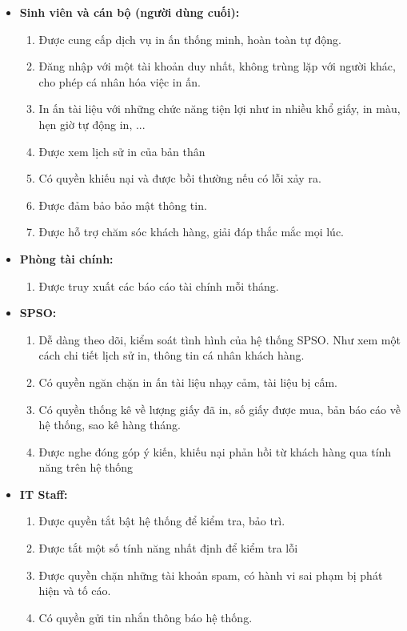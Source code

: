 \begin{itemize}
    \item \textbf{Sinh viên và cán bộ (người dùng cuối):}
    \begin{enumerate}[- ]
        \item Được cung cấp dịch vụ in ấn thống minh, hoàn toàn tự động. 
        \item Đăng nhập với một tài khoản duy nhất, không trùng lặp với người khác, cho phép cá nhân hóa việc in ấn.
        \item In ấn tài liệu với những chức năng tiện lợi như in nhiều khổ giấy, in màu, hẹn giờ tự động in, ...
        \item Được xem lịch sử in của bản thân
        \item Có quyền khiếu nại và được bồi thường nếu có lỗi xảy ra.
        \item Được đảm bảo bảo mật thông tin.
        \item Được hỗ trợ chăm sóc khách hàng, giải đáp thắc mắc mọi lúc.
    \end{enumerate}

    \item \textbf{Phòng tài chính:}
    \begin{enumerate}[- ]
        \item Được truy xuất các báo cáo tài chính mỗi tháng.
    \end{enumerate}

    \item \textbf{SPSO:}
    \begin{enumerate}[- ]
        \item Dễ dàng theo dõi, kiểm soát tình hình của hệ thống SPSO. Như xem một cách chi tiết lịch sử in, thông tin cá nhân khách hàng.
        \item Có quyền ngăn chặn in ấn tài liệu nhạy cảm, tài liệu bị cấm.
        \item Có quyền thống kê về lượng giấy đã in, số giấy được mua, bản báo cáo về hệ thống, sao kê hàng tháng.
        \item Được nghe đóng góp ý kiến, khiếu nại phản hồi từ khách hàng qua tính năng trên hệ thống
    \end{enumerate}

    \item \textbf{IT Staff:}
    \begin{enumerate}[- ]
        \item Được quyền tắt bật hệ thống để kiểm tra, bảo trì.
        \item Được tắt một số tính năng nhất định để kiểm tra lỗi
        \item Được quyền chặn những tài khoản spam, có hành vi sai phạm bị phát hiện và tố cáo.
        \item Có quyền gửi tin nhắn thông báo hệ thống.
    \end{enumerate}


\end{itemize}
